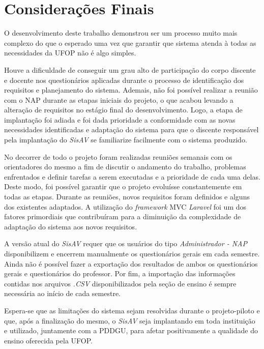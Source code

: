 \documentclass[
  12pt,       %
  openright,      %
  oneside,      %
  a4paper,      %
  english,      %
  french,        %
  spanish,     %
  brazil        %
  ]{abntex2-decsi}
\begin{document}

\chapter{Considerações Finais}\label{conclusao}
    
O desenvolvimento deste trabalho demonstrou ser um processo muito mais complexo do que o esperado uma vez que garantir que sistema atenda à todas as necessidades da UFOP não é algo simples. 

Houve a dificuldade de conseguir um grau alto de participação do corpo discente e docente nos questionários aplicadas durante o processo de identificação dos requisitos e planejamento do sistema. Ademais, não foi possível realizar a reunião com o NAP durante as etapas iniciais do projeto, o que acabou levando a alteração de requisitos no estágio final do desenvolvimento. Logo, a etapa de implantação foi adiada e foi dada prioridade a conformidade com as novas necessidades identificadas e adaptação do sistema para que o discente responsável pela implantação do \textit{SisAV} se familiarize facilmente com o sistema produzido.

No decorrer de todo o projeto foram realizadas reuniões semanais com os orientadores do mesmo a fim de discutir o andamento do trabalho, problemas enfrentados e definir tarefas a serem executadas e a prioridade de cada uma delas. Deste modo, foi possível garantir que o projeto evoluísse constantemente em todas as etapas. Durante as reuniões, novos requisitos foram definidos e alguns dos existentes adaptados. A utilização do \textit{framework} MVC \textit{Laravel} foi um dos fatores primordiais que contribuíram para a diminuição da complexidade de adaptação do sistema aos novos requisitos.

A versão atual do \textit{SisAV} requer que os usuários do tipo \textit{Administrador - NAP} disponibilizem e encerrem manualmente os questionários gerais em cada semestre. Ainda não é possível fazer a exportação dos resultados de ambos os questionários gerais e questionários do professor. Por fim, a importação das informações contidas nos arquivos \textit{.CSV} disponibilizados pela seção de ensino é sempre necessária ao início de cada semestre. 

Espera-se que as limitações do sistema sejam resolvidas durante o projeto-piloto e que, após a finalização do mesmo, o \textit{SisAV} seja implantando em toda instituição e utilizado, juntamente com a PDDGU, para afetar positivamente a qualidade do ensino oferecida pela UFOP.
    
\end{document}
